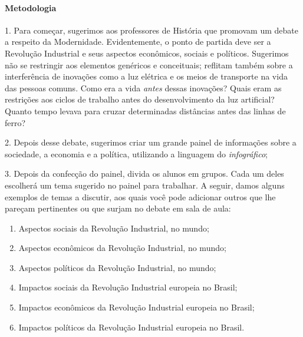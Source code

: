 \documentclass[11pt]{extarticle}
\begin{document}
\paragraph{Metodologia}

1. Para começar, sugerimos aos professores de História que promovam um
debate a respeito da Modernidade. Evidentemente, o ponto de partida deve
ser a Revolução Industrial e seus aspectos econômicos, sociais e
políticos. Sugerimos não se restringir aos elementos genéricos e
conceituais; reflitam também sobre a interferência de inovações como a
luz elétrica e os meios de transporte na vida das pessoas comuns. Como
era a vida \emph{antes} dessas inovações? Quais eram as restrições aos
ciclos de trabalho antes do desenvolvimento da luz artificial? Quanto
tempo levava para cruzar determinadas distâncias antes das linhas de
ferro?

\vspace{3mm}

2. Depois desse debate, sugerimos criar um grande painel de informações
sobre a sociedade, a economia e a política, utilizando a linguagem do
\emph{infográfico};


3. Depois da confecção do painel, divida os alunos em grupos. Cada um
deles escolherá um tema sugerido no painel para trabalhar. A seguir,
damos alguns exemplos de temas a discutir, aos quais você pode adicionar
outros que lhe pareçam pertinentes ou que surjam no debate em sala de
aula:

\begin{enumerate}

\item Aspectos sociais da Revolução Industrial, no mundo;

\item Aspectos econômicos da Revolução Industrial, no mundo;

\item Aspectos políticos da Revolução Industrial, no mundo;

\item Impactos sociais da Revolução Industrial europeia no Brasil;

\item Impactos econômicos da Revolução Industrial europeia no Brasil;

\item Impactos políticos da Revolução Industrial europeia no Brasil.

\end{enumerate} 
\end{document}
